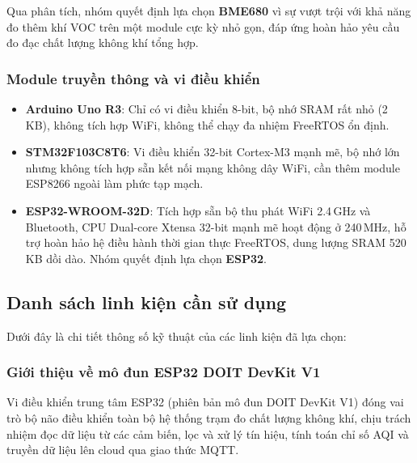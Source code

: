 \documentclass[12pt,a4paper]{article}
\begin{document}
Qua phân tích, nhóm quyết định lựa chọn \textbf{BME680} vì sự vượt trội với khả năng đo thêm khí VOC trên một module cực kỳ nhỏ gọn, đáp ứng hoàn hảo yêu cầu đo đạc chất lượng không khí tổng hợp.

\subsubsection{Module truyền thông và vi điều khiển}
\begin{itemize}
    \item \textbf{Arduino Uno R3}: Chỉ có vi điều khiển 8-bit, bộ nhớ SRAM rất nhỏ (2\,KB), không tích hợp WiFi, không thể chạy đa nhiệm FreeRTOS ổn định.
    \item \textbf{STM32F103C8T6}: Vi điều khiển 32-bit Cortex-M3 mạnh mẽ, bộ nhớ lớn nhưng không tích hợp sẵn kết nối mạng không dây WiFi, cần thêm module ESP8266 ngoài làm phức tạp mạch.
    \item \textbf{ESP32-WROOM-32D}: Tích hợp sẵn bộ thu phát WiFi 2.4\,GHz và Bluetooth, CPU Dual-core Xtensa 32-bit mạnh mẽ hoạt động ở 240\,MHz, hỗ trợ hoàn hảo hệ điều hành thời gian thực FreeRTOS, dung lượng SRAM 520\,KB dồi dào. Nhóm quyết định lựa chọn \textbf{ESP32}.
\end{itemize}

\subsection{Danh sách linh kiện cần sử dụng}
Dưới đây là chi tiết thông số kỹ thuật của các linh kiện đã lựa chọn:

\subsubsection{Giới thiệu về mô đun ESP32 DOIT DevKit V1}
Vi điều khiển trung tâm ESP32 (phiên bản mô đun DOIT DevKit V1) đóng vai trò bộ não điều khiển toàn bộ hệ thống trạm đo chất lượng không khí, chịu trách nhiệm đọc dữ liệu từ các cảm biến, lọc và xử lý tín hiệu, tính toán chỉ số AQI và truyền dữ liệu lên cloud qua giao thức MQTT.
\end{document}
